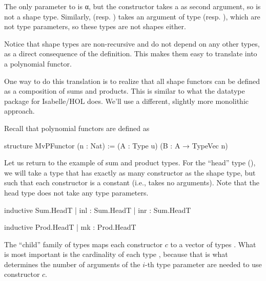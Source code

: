 \documentclass[titlepage]{report}
\newenvironment{remark}{%
\begin{framed}
\begin{trivlist}
    \item[\hskip \labelsep {\bfseries Remark:}]}%
{%
\end{trivlist}%
\end{framed}
}
\begin{document}
The only parameter to  is α, but the  constructor takes a  as second argument,
so  is not a shape type.
Similarly,  (resp. ) takes an argument of type  (resp. ),
which are not type parameters, so these types are not shapes either.

Notice that shape types are non-recursive and do not depend on any other types, as a direct consequence 
of the definition. This makes them easy to translate into a polynomial functor. 

\begin{remark}
    One way to do this translation is to realize that all shape functors can be defined as a
    composition of sums and products. 
    This is similar to what the datatype package for Isabelle/HOL does.
    We'll use a different, slightly more monolithic approach.
\end{remark}

Recall that polynomial functors are defined as
\begin{leancode}
    structure MvPFunctor (n : Nat) :=
      (A : Type u) (B : A → TypeVec n)
\end{leancode}


Let us return to the example of sum and product types. 
For the ``head'' type (), we will take a type that has exactly as many constructor as
the shape type, but such that each constructor is a constant (i.e., takes no arguments).
Note that the head type does not take any type parameters. 

\begin{center}
    \begin{minipage}[t]{0.45\linewidth}
        \begin{leancode}
    inductive Sum.HeadT
      | inl : Sum.HeadT
      | inr : Sum.HeadT
        \end{leancode}
    \end{minipage}
    \begin{minipage}[t]{0.45\linewidth}
        \begin{leancode}    
    inductive Prod.HeadT
      | mk : Prod.HeadT
        \end{leancode}
    \end{minipage}
\end{center}

The ``child'' family of types maps each constructor $c$ to a vector of types .
What is most important is the cardinality of each type , 
because that is what determines the number of arguments of the $i$-th type parameter are needed
to use constructor $c$. 
\end{document}
